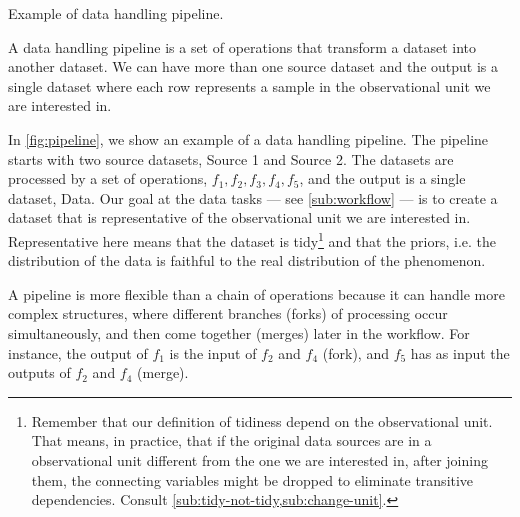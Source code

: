 \begin{figurebox}[label=fig:pipeline]{Example of data handling pipeline.}
  \centering
  \tcblower
  A data handling pipeline is a set of operations that transform a dataset into
  another dataset.  We can have more than one source dataset and the output is a single
  dataset where each row represents a sample in the observational unit we are interested
  in.
\end{figurebox}

In \cref{fig:pipeline}, we show an example of a data handling pipeline.  The pipeline
starts with two source datasets, Source 1 and Source 2.  The datasets are processed by a
set of operations, $f_1, f_2, f_3, f_4, f_5$, and the output is a single dataset,
Data.  Our goal at the data tasks --- see \cref{sub:workflow} --- is to create a dataset
that is representative of the observational unit we are interested in.  Representative
here means that the dataset is tidy\footnote{Remember that our definition of tidiness
depend on the observational unit.  That means, in practice, that if the original data
sources are in a observational unit different from the one we are interested in, after
joining them, the connecting variables might be dropped to eliminate transitive
dependencies.  Consult \cref{sub:tidy-not-tidy,sub:change-unit}.} and that the priors,
i.e. the distribution of the data is faithful to the real distribution of the phenomenon.

A pipeline is more flexible than a chain of operations because it can handle more complex
structures, where different branches (forks) of processing occur simultaneously, and then
come together (merges) later in the workflow.  For instance, the output of $f_1$ is the
input of $f_2$ and $f_4$ (fork), and $f_5$ has as input the outputs of $f_2$ and $f_4$
(merge).

